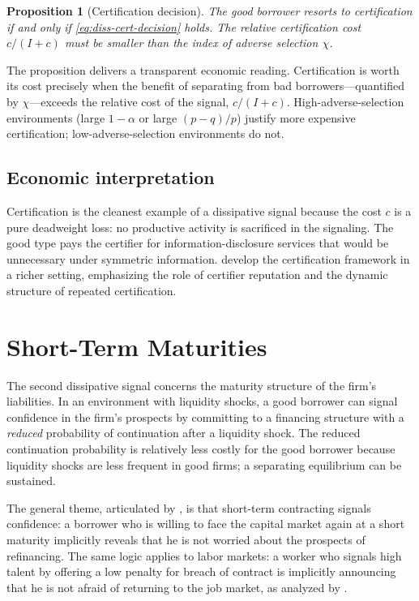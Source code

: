 \documentclass[11pt,a4paper,oneside]{book}
\theoremstyle{plain}
\newtheorem{proposition}[theorem]{Proposition}
\theoremstyle{definition}
\theoremstyle{remark}
\numberwithin{equation}{chapter}
\begin{document}
\begin{proposition}[Certification decision]\label{prop:diss-cert-decision}
The good borrower resorts to certification if and only if \eqref{eq:diss-cert-decision} holds.
The relative certification cost $c/(I + c)$ must be smaller than the index of adverse selection $\chi$.
\end{proposition}

The proposition delivers a transparent economic reading.
Certification is worth its cost precisely when the benefit of separating from bad borrowers---quantified by $\chi$---exceeds the relative cost of the signal, $c/(I + c)$.
High-adverse-selection environments (large $1 - \alpha$ or large $(p-q)/p$) justify more expensive certification; low-adverse-selection environments do not.

\subsection{Economic interpretation}

Certification is the cleanest example of a dissipative signal because the cost $c$ is a pure deadweight loss: no productive activity is sacrificed in the signaling.
The good type pays the certifier for information-disclosure services that would be unnecessary under symmetric information.
\citet{ChemmanurFulghieri1999} develop the certification framework in a richer setting, emphasizing the role of certifier reputation and the dynamic structure of repeated certification.

\section{Short-Term Maturities}
\label{sec:diss-short}

The second dissipative signal concerns the maturity structure of the firm's liabilities.
In an environment with liquidity shocks, a good borrower can signal confidence in the firm's prospects by committing to a financing structure with a \emph{reduced} probability of continuation after a liquidity shock.
The reduced continuation probability is relatively less costly for the good borrower because liquidity shocks are less frequent in good firms; a separating equilibrium can be sustained.

The general theme, articulated by \citet{Diamond1991, Diamond1993}, is that short-term contracting signals confidence: a borrower who is willing to face the capital market again at a short maturity implicitly reveals that he is not worried about the prospects of refinancing.
The same logic applies to labor markets: a worker who signals high talent by offering a low penalty for breach of contract is implicitly announcing that he is not afraid of returning to the job market, as analyzed by \citet{Hermalin2002}.
\end{document}
